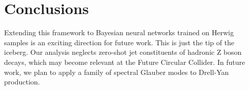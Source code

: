 \section{Conclusions}\label{sec:conclusions}

Extending this framework to Bayesian neural networks trained on Herwig
samples is an exciting direction for future work. This is just the tip
of the iceberg. Our analysis neglects zero-shot jet constituents of
hadronic Z boson decays, which may become relevant at the Future
Circular Collider. In future work, we plan to apply a family of spectral
Glauber modes to Drell-Yan production.

